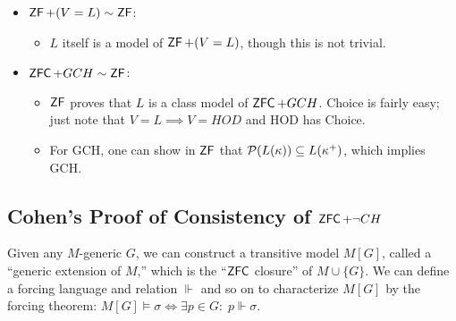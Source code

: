 \documentclass{amsart}
\DeclareMathOperator{\ZFC}{\sf{ZFC}}
\DeclareMathOperator{\ZF}{\sf{ZF}}
\DeclareMathOperator{\Con}{\rm{Con}}
\begin{document}
\begin{itemize}
\begin{itemize}
			\item For Choice, it is equivalent to show the well-ordering principle.
		\end{itemize}
		\item $\ZF+ (V=L) \sim \ZF$:
		\begin{itemize}
			\item $L$ itself is a model of $\ZF+ (V=L)$, though this is not trivial.
		\end{itemize}
		\item $\ZFC + GCH \sim \ZF$:
		\begin{itemize}
			\item $\ZF$ proves that $L$ is a class model of $\ZFC + GCH$. Choice is fairly easy; just note that $V=L\implies V= HOD$ and HOD has Choice.
			\item For GCH, one can show in $\ZF$ that $\mathcal{P}(L(\kappa))\subseteq L(\kappa^+)$, which implies GCH.\\
		\end{itemize}
	\end{itemize}
	

\subsection{Cohen's Proof of Consistency of $\ZFC + \neg CH$} Given any $M$-generic $G$, we can construct a transitive model $M[G]$, called a ``generic extension of $M$,'' which is the ``$\ZFC$ closure'' of $M\cup \{G\}$. We can define a forcing language and relation $\Vdash$ and so on to characterize $M[G]$ by the forcing theorem: $M[G]\models \sigma \iff \exists p\in G: \; p\Vdash \sigma$.
	
\end{document}
